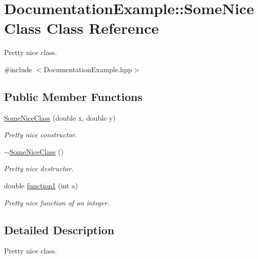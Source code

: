\hypertarget{class_documentation_example_1_1_some_nice_class}{\section{Documentation\-Example\-:\-:Some\-Nice\-Class Class Reference}
\label{class_documentation_example_1_1_some_nice_class}
}


Pretty nice class.  




{\ttfamily \#include $<$Documentation\-Example.\-hpp$>$}

\subsection*{Public Member Functions}
\begin{DoxyCompactItemize}
\item 
\hyperlink{class_documentation_example_1_1_some_nice_class_a2eba9b893fc9eb8b4f8dfcaa76745e6e}{Some\-Nice\-Class} (double x, double y)
\begin{DoxyCompactList}\small\item\em Pretty nice constructor. \end{DoxyCompactList}\item 
\hyperlink{class_documentation_example_1_1_some_nice_class_a8f62e97b6ac0ee8d3f3f34f7d9c57c87}{$\sim$\-Some\-Nice\-Class} ()
\begin{DoxyCompactList}\small\item\em Pretty nice destructor. \end{DoxyCompactList}\item 
double \hyperlink{class_documentation_example_1_1_some_nice_class_a610a11f2c60040aa06b5fb60a6e60a48}{function1} (int a)
\begin{DoxyCompactList}\small\item\em Pretty nice function of an integer. \end{DoxyCompactList}\end{DoxyCompactItemize}


\subsection{Detailed Description}
Pretty nice class. 

